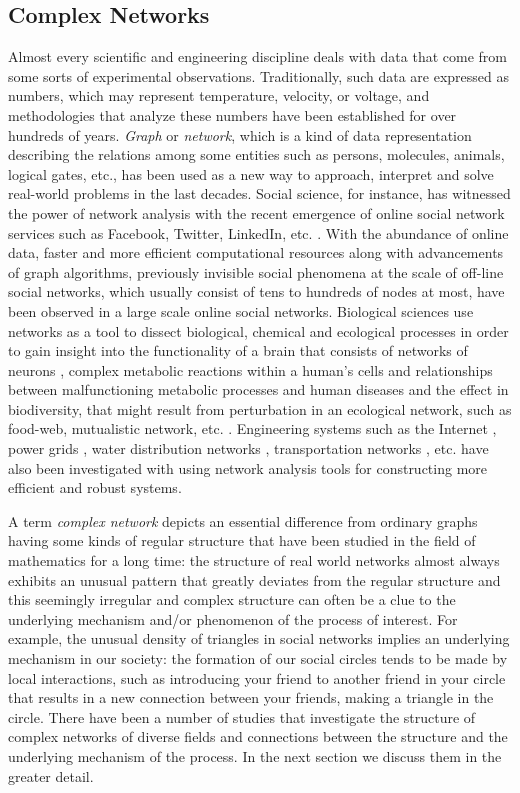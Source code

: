 \documentclass{article}
\begin{document}
	\subsection{Complex Networks}
	Almost every scientific and engineering discipline deals with data that come from some sorts of experimental observations. Traditionally, such data are expressed as numbers, which may represent temperature, velocity, or voltage, and methodologies that analyze these numbers have been established for over hundreds of years. \textit{Graph} or \textit{network}, which is a kind of data representation describing the relations among some entities such as persons, molecules, animals, logical gates, etc., has been used as a new way to approach, interpret and solve real-world problems in the last decades. Social science, for instance, has witnessed the power of network analysis with the recent emergence of online social network services such as Facebook, Twitter, LinkedIn, etc. \cite{Kleinberg:1}. With the abundance of online data, faster and more efficient computational resources along with advancements of graph algorithms, previously invisible social phenomena at the scale of off-line social networks, which usually consist of tens to hundreds of nodes at most, have been observed in a large scale online social networks.  Biological sciences use networks as a tool to dissect biological, chemical and ecological processes in order to gain insight into the functionality of a brain that consists of networks of neurons \cite{BrainNetwork}, complex metabolic reactions within a human's cells and relationships between malfunctioning metabolic processes and human diseases \cite{MetabolicNetworkAndDiseases} and the effect in biodiversity, that might result from perturbation in an ecological network, such as food-web, mutualistic network, etc. \cite{EcologicalNetwork}. Engineering systems such as the Internet \cite{Internet}, power grids \cite{PowerGrid}, water distribution networks \cite{WaterDistribution}, transportation networks \cite{Train}, etc. have also been investigated with using network analysis tools for constructing more efficient and robust systems. 
	
	A term \textit{complex network} depicts an essential difference from ordinary graphs having some kinds of regular structure that have been studied in the field of mathematics for a long time: the structure of real world networks almost always exhibits an unusual pattern that greatly deviates from the regular structure and this seemingly irregular and complex structure can often be a clue to the underlying mechanism and/or phenomenon of the process of interest.  For example, the unusual density of triangles in social networks implies an underlying mechanism in our society: the formation of our social circles tends to be made by local interactions, such as introducing your friend to another friend in your circle that results in a new connection between your friends, making a triangle in the circle. There have been a number of studies that investigate the structure of complex networks of diverse fields and connections between the structure and the underlying mechanism of the process. In the next section we discuss them in the greater detail.
	
\end{document}
